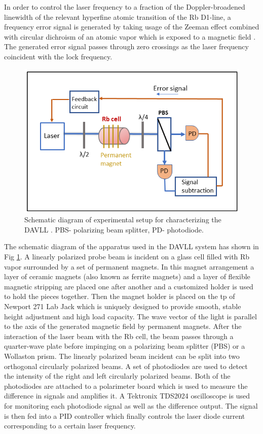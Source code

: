 In order to control the laser frequency to a fraction of the Doppler-broadened linewidth of the relevant hyperfine atomic transition of the Rb D1-line, a frequency error signal is generated by taking usage of the Zeeman effect combined with circular dichroism of an atomic vapor which is exposed to a magnetic field \cite{doi:10.1063/1.3568824}. The generated error signal passes through zero crossings as the laser frequency coincident with the lock frequency. 
\begin{figure}[h]
\centering
\includegraphics[width=0.8\linewidth]{figures/DAVLL}
\caption{Schematic diagram of experimental setup for characterizing the DAVLL . PBS- polarizing beam splitter, PD- photodiode.\label{fig:DAVLL}}
\end{figure}
The schematic diagram of the apparatus used in  the DAVLL system has shown in Fig \ref{fig:DAVLL}. A linearly polarized probe beam is incident on a glass cell filled with Rb vapor surrounded by a set of permanent magnets. In this magnet arrangement a layer of ceramic magnets (also known as ferrite magnets) and a layer of flexible magnetic stripping are placed one after another and a customized holder is used to hold the pieces together. Then the magnet holder is placed on the tp of Newport 271 Lab Jack which is uniquely designed to provide smooth, stable height adjustment and high load capacity.  The wave vector of the light is parallel to the axis of the generated magnetic field by permanent magnets. After the interaction of the laser beam with the Rb cell, the beam passes through a quarter-wave plate before impinging on a polarizing beam splitter (PBS) or a Wollaston prism. The linearly polarized beam incident can be split into two orthogonal circularly polarized beams. A set of photodiodes are used to detect the intensity of the right and left circularly polarized beams. Both of the photodiodes are attached to a polarimeter board which is used to measure the difference in signals and amplifies it. A Tektronix TDS2024 oscilloscope is used for monitoring each photodiode signal as well as the difference output. The signal is then fed into a PID controller which finally controls the laser diode current corresponding to a certain laser frequency.


